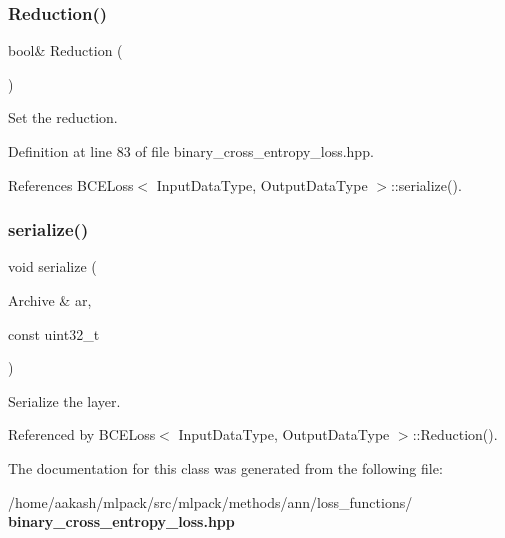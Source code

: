 \subsubsection{Reduction()\hspace{0.1cm}{\footnotesize\ttfamily [2/2]}}
{\footnotesize\ttfamily bool\& Reduction (\begin{DoxyParamCaption}{ }\end{DoxyParamCaption})\hspace{0.3cm}{\ttfamily [inline]}}



Set the reduction. 



Definition at line 83 of file binary\+\_\+cross\+\_\+entropy\+\_\+loss.\+hpp.



References B\+C\+E\+Loss$<$ Input\+Data\+Type, Output\+Data\+Type $>$\+::serialize().

\mbox{\label{classmlpack_1_1ann_1_1BCELoss_a65cba07328997659bec80b9879b15a51}} 
\subsubsection{serialize()}
{\footnotesize\ttfamily void serialize (\begin{DoxyParamCaption}\item[{Archive \&}]{ar,  }\item[{const uint32\+\_\+t}]{ }\end{DoxyParamCaption})}



Serialize the layer. 



Referenced by B\+C\+E\+Loss$<$ Input\+Data\+Type, Output\+Data\+Type $>$\+::\+Reduction().



The documentation for this class was generated from the following file\+:\begin{DoxyCompactItemize}
\item 
/home/aakash/mlpack/src/mlpack/methods/ann/loss\+\_\+functions/\textbf{ binary\+\_\+cross\+\_\+entropy\+\_\+loss.\+hpp}\end{DoxyCompactItemize}

